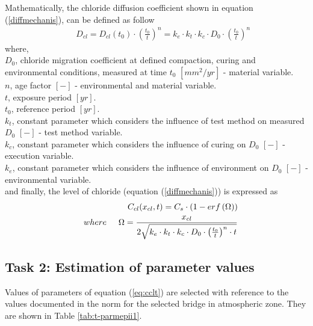 \documentclass[Journal]{ascelike}
\begin{document}
Mathematically, the chloride diffusion coefficient shown in equation
(\ref{diffmechanis}), can be defined as follow 
\begin{eqnarray}
 &  & D_{cl}=D_{cl}(t_{0})\cdot\left(\frac{t_{0}}{t}\right)^{n}=k_{e}\cdot k_{t}\cdot k_{c}\cdot D_{0}\cdot\left(\frac{t_{0}}{t}\right)^{n}\label{eq:dclt}
\end{eqnarray}
where,\\
 $D_{0}$, chloride migration coefficient at defined compaction, curing
and environmental conditions, measured at time $t_{0}$ $[mm^{2}/yr]$
- material variable.\\
 $n$, age factor $[-]$ - environmental and material variable.\\
$t$, exposure period $[yr]$.\\
 $t_{0}$, reference period $[yr]$.\\
 $k_{t}$, constant parameter which considers the influence of test
method on measured $D_{0}$ $[-]$ - test method variable.\\
 $k_{c}$, constant parameter which considers the influence of curing
on $D_{0}$ $[-]$ - execution variable.\\
 $k_{e}$, constant parameter which considers the influence of environment
on $D_{0}$ $[-]$ - environmental variable.\\
and finally, the level of chloride (equation (\ref{diffmechanis}))
is expressed as 
\begin{eqnarray}
 &  & C_{cl}(x_{cl},t)=C_{s}\cdot\left(1-erf\left(\Omega\right)\right)\label{eq:cclt}\\
 &  & where\hspace{5mm}\Omega=\frac{x_{cl}}{2\sqrt{k_{e}\cdot k_{t}\cdot k_{c}\cdot D_{0}\cdot\left(\frac{t_{0}}{t}\right)^{n}\cdot t}}\nonumber 
\end{eqnarray}



\subsection{Task 2: Estimation of parameter values}
Values of parameters of equation (\ref{eq:cclt}) are selected with
reference to the values documented in the norm \cite{DuraCrete2000}
for the selected bridge in atmospheric zone. They are shown in Table
\ref{tab:t-parmepii1}. %
\end{document}
